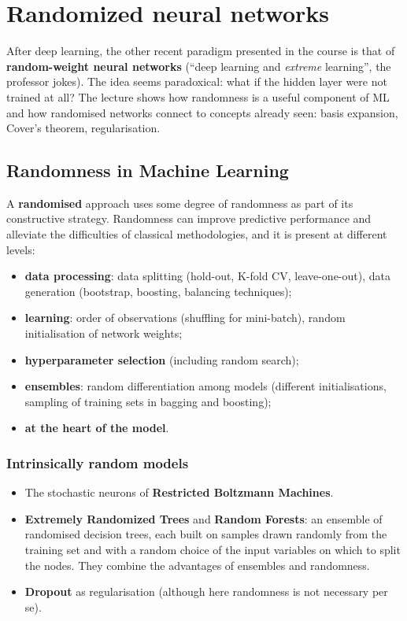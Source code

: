 \chapter{Randomized neural networks}\label{ch-18}

After deep learning, the other recent paradigm presented in the course
is that of \textbf{random-weight neural networks} (``deep learning and
\emph{extreme} learning'', the professor jokes). The idea seems
paradoxical: what if the hidden layer were not trained at all? The
lecture shows how randomness is a useful component of ML and how
randomised networks connect to concepts already seen: basis expansion,
Cover's theorem, regularisation.

\section{Randomness in Machine
Learning}\label{la-casualituxe0-nel-machine-learning}

A \textbf{randomised} approach uses some degree of randomness as part
of its constructive strategy. Randomness can improve predictive
performance and alleviate the difficulties of classical methodologies,
and it is present at different levels:

\begin{itemize}
\tightlist
\item
  \textbf{data processing}: data splitting (hold-out, K-fold CV,
  leave-one-out), data generation (bootstrap, boosting, balancing
  techniques);
\item
  \textbf{learning}: order of observations (shuffling for mini-batch),
  random initialisation of network weights;
\item
  \textbf{hyperparameter selection} (including random search);
\item
  \textbf{ensembles}: random differentiation among models (different
  initialisations, sampling of training sets in bagging and boosting);
\item
  \textbf{at the heart of the model}.
\end{itemize}

\subsection{Intrinsically random
models}\label{modelli-intrinsecamente-casuali}

\begin{itemize}
\tightlist
\item
  The stochastic neurons of \textbf{Restricted Boltzmann Machines}.
\item
  \textbf{Extremely Randomized Trees} and \textbf{Random Forests}: an
  ensemble of randomised decision trees, each built on samples drawn
  randomly from the training set and with a random choice of the input
  variables on which to split the nodes. They combine the advantages of
  ensembles and randomness.
\item
  \textbf{Dropout} as regularisation (although here randomness is not
  necessary per se).
\end{itemize}

